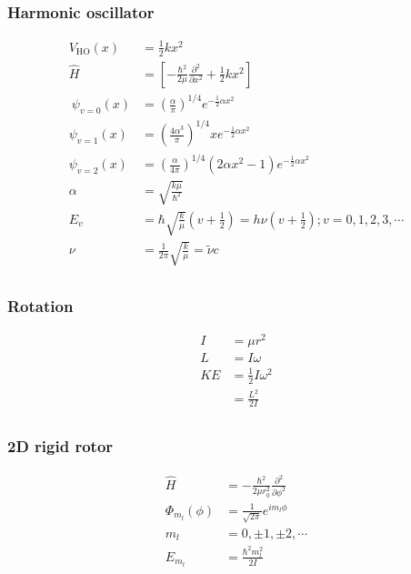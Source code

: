 \subsubsection{Harmonic oscillator}
\begin{align*}
V_{\textrm{HO}}\left(x\right)&=\frac{1}{2}kx^2\\
\hat{H}&=\left[-\frac{\hbar^2}{2\mu} \frac{\partial^2}{\partial x^2}+ \frac{1}{2}kx^2\right]\\\
\psi_{v=0}\left(x\right)&=\left(\frac{\alpha}{\pi}\right)^{1/4}e^{-\frac{1}{2}\alpha x^2}\\
\psi_{v=1}\left(x\right)&=\left(\frac{4\alpha^3}{\pi}\right)^{1/4}xe^{-\frac{1}{2}\alpha x^2}\\
\psi_{v=2}\left(x\right)&=\left(\frac{\alpha}{4\pi}\right)^{1/4}\left(2\alpha x^2-1\right)e^{-\frac{1}{2}\alpha x^2}\\
\alpha&=\sqrt{\frac{k\mu}{\hbar^2}}\\
E_v&=\hbar\sqrt{\frac{k}{\mu}}\left(v+\frac{1}{2}\right)=h\nu\left(v+\frac{1}{2}\right); v = 0, 1, 2, 3, \cdots\\
\nu&=\frac{1}{2\pi}\sqrt{\frac{k}{\mu}}=\tilde{\nu}c\\
\end{align*}

\subsubsection{Rotation}
\begin{align*}
I&=\mu r^2\\
L&=I\omega\\
KE&=\frac{1}{2}I\omega^2\\
&=\frac{L^2}{2I}\\
\end{align*}

\subsubsection{2D rigid rotor}
\begin{align*}
\hat{H}&=-\frac{\hbar^2}{2\mu r_0^2}\frac{\partial^2}{\partial \phi^2}\\
\Phi_{m_l}\left(\phi\right)&=\frac{1}{\sqrt{2\pi}}e^{im_l\phi}\\
m_l&=0, \pm1, \pm2, \cdots\\
E_{m_l}&=\frac{\hbar^2 m_l^2}{2I}\\
\end{align*}


